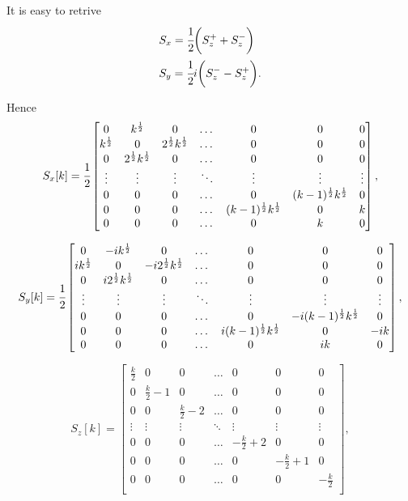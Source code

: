 \documentclass[main.tex]{subfiles}
\begin{document}
It is easy to retrive
\begin{align}
& S_x = \cfrac{1}{2}\bigg(S^{+}_z + S^{-}_z \bigg)\\
& S_y = \cfrac{1}{2}i\bigg(S^{-}_z - S^{+}_z \bigg).
\end{align}

Hence
\begin{equation}
\label{Sx-matrix}
S_x[k] = \cfrac{1}{2} \begin{bmatrix}
    0 & k^{\frac{1}{2}} & 0 & \dots  & 0 & 0 & 0 \\
    k^{\frac{1}{2}} & 0 & 2^{\frac{1}{2}}k^{\frac{1}{2}} & \dots & 0 & 0 & 0\\
    0 & 2^{\frac{1}{2}}k^{\frac{1}{2}} & 0 & \dots  & 0 & 0 & 0\\
    \vdots  & \vdots & \vdots  & \ddots & \vdots & \vdots & \vdots\\
    0 & 0 & 0 & \dots  & 0 & (k-1)^{\frac{1}{2}}k^{\frac{1}{2}} & 0 \\
    0 & 0 & 0 & \dots & (k-1)^{\frac{1}{2}}k^{\frac{1}{2}} & 0 & k\\
    0 & 0 & 0 & \dots  & 0 & k & 0\\
\end{bmatrix},
\end{equation}

\begin{equation}
\label{Sy-matrix}
S_y[k] = \cfrac{1}{2} \begin{bmatrix}
    0 & - ik^{\frac{1}{2}} & 0 & \dots  & 0 & 0 & 0 \\
    ik^{\frac{1}{2}} & 0 & -i2^{\frac{1}{2}}k^{\frac{1}{2}} & \dots & 0 & 0 & 0\\
    0 & i2^{\frac{1}{2}}k^{\frac{1}{2}} & 0 & \dots  & 0 & 0 & 0\\
    \vdots  & \vdots & \vdots  & \ddots & \vdots & \vdots & \vdots\\
    0 & 0 & 0 & \dots  & 0 & -i(k-1)^{\frac{1}{2}}k^{\frac{1}{2}} & 0 \\
    0 & 0 & 0 & \dots & i(k-1)^{\frac{1}{2}}k^{\frac{1}{2}} & 0 & -ik\\
    0 & 0 & 0 & \dots  & 0 & ik & 0\\
\end{bmatrix},
\end{equation}

\begin{equation}
\label{Sz-matrix}
S_z[k] = \begin{bmatrix}
    \frac{k}{2} & 0 & 0 & \dots  & 0 & 0 & 0 \\
    0 & \frac{k}{2} - 1 & 0 & \dots & 0 & 0 & 0\\
    0 & 0 & \frac{k}{2} - 2 & \dots  & 0 & 0 & 0\\
    \vdots  & \vdots & \vdots  & \ddots & \vdots & \vdots & \vdots\\
    0 & 0 & 0 & \dots  & -\frac{k}{2} + 2 & 0 & 0 \\
    0 & 0 & 0 & \dots & 0 & -\frac{k}{2} + 1 & 0\\
    0 & 0 & 0 & \dots  & 0 & 0 & -\frac{k}{2}\\
\end{bmatrix},
\end{equation}
\end{document}
